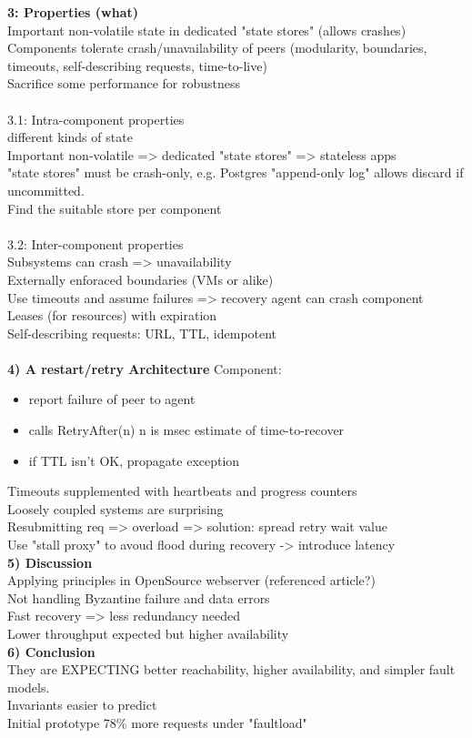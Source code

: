 \textbf{3: Properties (what)} \\
Important non-volatile state in dedicated "state stores" (allows crashes) \\
Components tolerate crash/unavailability of peers (modularity, boundaries, timeouts, self-describing requests, time-to-live)\\
Sacrifice some performance for robustness \\
\\
3.1: Intra-component properties \\
different kinds of state \\
Important non-volatile => dedicated "state stores" => stateless apps \\
"state stores" must be crash-only, e.g. Postgres "append-only log" allows discard if uncommitted. \\
Find the suitable store per component \\
\\
3.2: Inter-component properties \\
Subsystems can crash => unavailability \\
Externally enforaced boundaries (VMs or alike) \\
Use timeouts and assume failures => recovery agent can crash component \\
Leases (for resources) with expiration \\
Self-describing requests: URL, TTL, idempotent \\
\\
\textbf{4) A restart/retry Architecture}
Component: \\
\begin{itemize}
	\item report failure of peer to agent
	\item calls RetryAfter(n) n is msec estimate of time-to-recover
	\item if TTL isn't OK, propagate exception
\end{itemize}
Timeouts supplemented with heartbeats and progress counters \\
Loosely coupled systems are surprising \\
Resubmitting req => overload => solution: spread retry wait value \\
Use "stall proxy" to avoud flood during recovery -> introduce latency \\

\textbf{5) Discussion} \\
Applying principles in OpenSource webserver (referenced article?) \\
Not handling Byzantine failure and data errors \\
Fast recovery => less redundancy needed \\
Lower throughput expected but higher availability \\

\textbf{6) Conclusion} \\
They are EXPECTING better reachability, higher availability, and simpler fault models. \\
Invariants easier to predict \\
Initial prototype 78\% more requests under "faultload"